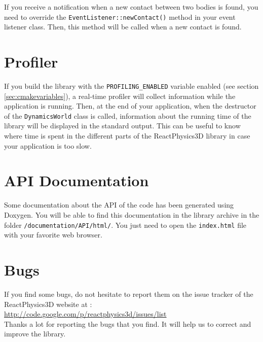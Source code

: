 \documentclass[a4paper,12pt]{article}
\begin{document}
   If you receive a notification when a new contact between two bodies is found, you need to override the \texttt{EventListener::newContact()} method in your event listener class. Then, this
   method will be called when a new contact is found.

    \section{Profiler}

    If you build the library with the \texttt{PROFILING\_ENABLED} variable enabled (see section \ref{sec:cmakevariables}), a real-time profiler will collect information while the application
    is running. Then, at the end of your application, when the destructor of the \texttt{DynamicsWorld} class is called, information about the running time of the library will be displayed in the
    standard output. This can be useful to know where time is spent in the different parts of the ReactPhysics3D library in case your application is too slow.

   \section{API Documentation}

   Some documentation about the API of the code has been generated
   using Doxygen. You will be able to find this documentation in the library archive in the folder \texttt{/documentation/API/html/}. You just
   need to open the \texttt{index.html} file with your favorite web browser.

    \section{Bugs}

    If you find some bugs, do not hesitate to report them on the issue tracker of the ReactPhysics3D website at : \\

    \url{http://code.google.com/p/reactphysics3d/issues/list} \\

    Thanks a lot for reporting the bugs that you find. It will help us to correct and improve the library.
   
\end{document}
